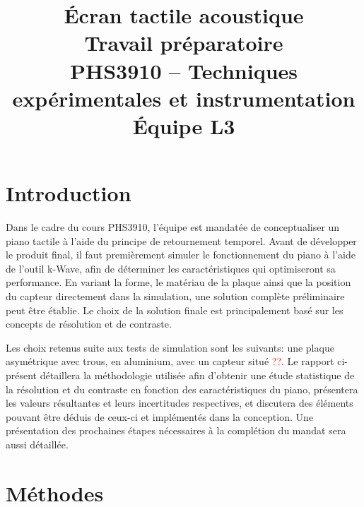 \documentclass[conference]{IEEEtran}
\begin{document}
\title{Écran tactile acoustique\\
\large Travail préparatoire \\
PHS3910 -- Techniques expérimentales et instrumentation\\ 
Équipe L3}

\author{
\and
{}
\and
{}
\and
{}
}

\maketitle

\section{Introduction}
Dans le cadre du cours PHS3910, l'équipe est mandatée de conceptualiser
un piano tactile à l'aide du principe de retournement temporel. Avant
de développer le produit final, il faut premièrement simuler le fonctionnement 
du piano à l'aide de l'outil k-Wave, afin de déterminer les caractéristiques qui 
optimiseront sa performance. En variant la forme, le matériau de 
la plaque ainsi que la position du capteur directement dans la simulation,
une solution complète préliminaire peut être établie. Le choix de la solution finale est
principalement basé sur les concepts de résolution et de contraste.

Les choix retenus suite aux tests de simulation sont les suivants: une plaque
asymétrique avec trous, en aluminium, avec un capteur situé \textcolor{red}{??}.
Le rapport ci-présent détaillera la méthodologie utilisée afin d'obtenir 
une étude statistique de la résolution et du contraste en fonction des
caractéristiques du piano, présentera les valeurs résultantes et leurs incertitudes 
respectives, et discutera des éléments pouvant être déduis de ceux-ci et implémentés 
dans la conception. Une présentation des prochaines étapes nécessaires à la complétion
du mandat sera aussi détaillée.

\section{Méthodes}
\end{document}

